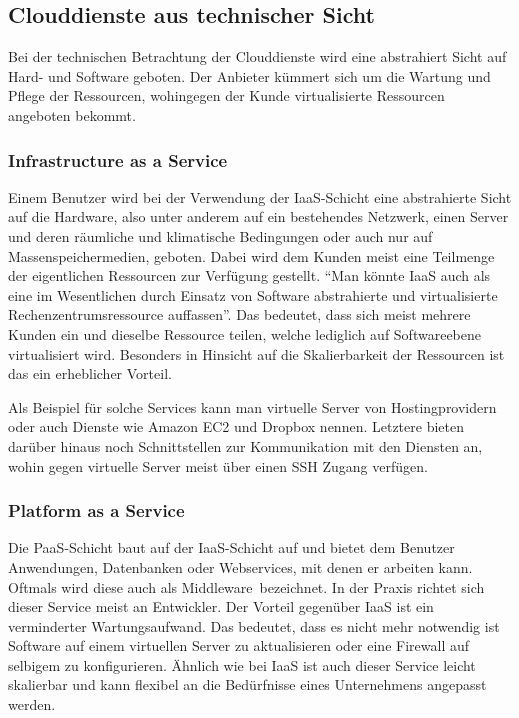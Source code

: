 \subsection{Clouddienste aus technischer Sicht}
Bei der technischen Betrachtung der Clouddienste wird eine abstrahiert Sicht auf Hard- und Software geboten.
Der Anbieter kümmert sich um die Wartung und Pflege der Ressourcen, wohingegen der Kunde virtualisierte Ressourcen angeboten bekommt.

\subsubsection{Infrastructure as a Service}
Einem Benutzer wird bei der Verwendung der \ac{IaaS}-Schicht eine abstrahierte Sicht auf die Hardware, also unter anderem auf ein bestehendes Netzwerk, einen Server und deren räumliche und klimatische Bedingungen oder auch nur auf Massenspeichermedien, geboten\cite[vgl.][Seite 47]{hoell11}.
Dabei wird dem Kunden meist eine Teilmenge der eigentlichen Ressourcen zur Verfügung gestellt.
"`Man könnte IaaS auch als eine im Wesentlichen durch Einsatz von Software abstrahierte und virtualisierte Rechenzentrumsressource auffassen"'\cite[Seite 47]{hoell11}.
Das bedeutet, dass sich meist mehrere Kunden ein und dieselbe Ressource teilen, welche lediglich auf Softwareebene virtualisiert wird.
Besonders in Hinsicht auf die Skalierbarkeit der Ressourcen ist das ein erheblicher Vorteil.

Als Beispiel für solche Services kann man virtuelle Server von Hostingprovidern oder auch Dienste wie Amazon EC2 und Dropbox nennen.
Letztere bieten darüber hinaus noch Schnittstellen zur Kommunikation mit den Diensten an, wohin gegen virtuelle Server meist über einen \ac{SSH} Zugang verfügen.

\subsubsection{Platform as a Service}
Die \ac{PaaS}-Schicht baut auf der \ac{IaaS}-Schicht auf und bietet dem Benutzer Anwendungen, Datenbanken oder Webservices, mit denen er arbeiten kann.
Oftmals wird diese auch als \frqq Middleware\flqq\ bezeichnet\cite[vgl.][Seite 47]{hoell11}.
In der Praxis richtet sich dieser Service meist an Entwickler.
Der Vorteil gegenüber \ac{IaaS} ist ein verminderter Wartungsaufwand.
Das bedeutet, dass es nicht mehr notwendig ist Software auf einem virtuellen Server zu aktualisieren oder eine Firewall auf selbigem zu konfigurieren.
Ähnlich wie bei \ac{IaaS} ist auch dieser Service leicht skalierbar und kann flexibel an die Bedürfnisse eines Unternehmens angepasst werden.

